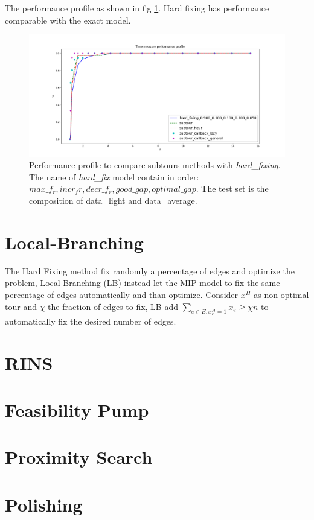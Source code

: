 The performance profile as shown in fig \ref{fig:Lsubtours_hardfixing_lightaverage_time}. Hard fixing has performance comparable with the exact model.

\begin{figure}[h]
	\centering
	\includegraphics[width=\columnwidth]{../res/Lsubtours_hardfixing_lightaverage_time.png}
	\caption{Performance profile to compare subtours methods with \textit{hard\_fixing}. The name of \textit{hard\_fix} model contain in order: $ max\_f_r, incr_fr, decr\_f_r, good\_gap, optimal\_gap $. The test set is the composition of data\_light and data\_average.}
	\label{fig:Lsubtours_hardfixing_lightaverage_time}
\end{figure}


\section{Local-Branching}
The Hard Fixing method fix randomly a percentage of edges and optimize the problem, Local Branching (LB) instead let the MIP model to fix the same percentage of edges automatically and than optimize. Consider $ x^H $ as non optimal tour and $ \chi $ the fraction of edges to fix, LB add $ \sum_{ e\in E: x_e^H = 1 } x_e \ge \chi n $ to automatically fix the desired number of edges. 

\section{RINS}
\section{Feasibility Pump}
\section{Proximity Search}
\section{Polishing}
